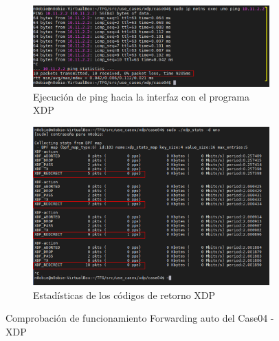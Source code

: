\begin{figure}[h]
    \centering
    \begin{subfigure}[b]{\textwidth}
    	\centering
        \includegraphics[width=13cm]{archivos/img/dev/xdp/case04/demo_case04_auto_2_edited.png}
        \caption{Ejecución de ping hacia la interfaz con el programa XDP}
        \label{fig:case04_xdp_ether_func3_ping}
    \end{subfigure}
    \par\bigskip
    \begin{subfigure}[b]{\textwidth}
    	\centering
        \includegraphics[width=14cm]{archivos/img/dev/xdp/case04/demo_case04_auto_3_edited.png}
        \caption{Estadísticas de los códigos de retorno XDP}
        \label{fig:case04_xdp_ether_func3_stats}
    \end{subfigure}
    \caption{Comprobación de funcionamiento Forwarding auto del Case04 - XDP}
    \label{fig:case04_xdp_ether_func3}
\end{figure}